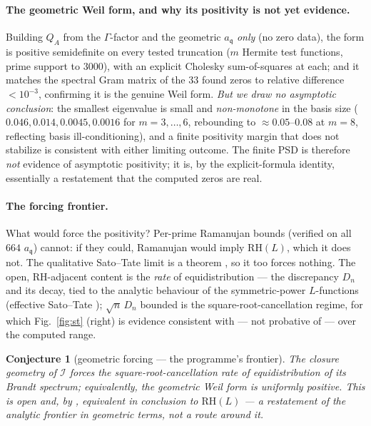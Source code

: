 \documentclass[11pt]{article}
\newtheorem{conjecture}[theorem]{Conjecture}
\theoremstyle{remark}
\newcommand{\II}{\mathcal{I}}
\newcommand{\RH}{\mathrm{RH}}
\newcommand{\fq}{\mathfrak{q}}
\begin{document}
\paragraph{The geometric Weil form, and why its positivity is not yet evidence.} Building
$Q_A$ from the $\Gamma$-factor and the geometric $a_\fq$ \emph{only} (no zero data), the form
is positive semidefinite on every tested truncation ($m$ Hermite test functions, prime
support to $3000$), with an explicit Cholesky sum-of-squares at each; and it matches the
spectral Gram matrix of the $33$ found zeros to relative difference $<10^{-3}$, confirming
it is the genuine Weil form. \emph{But we draw no asymptotic conclusion}: the smallest
eigenvalue is small and \emph{non-monotone} in the basis size ($0.046,0.014,0.0045,0.0016$
for $m=3,\dots,6$, rebounding to $\approx0.05$--$0.08$ at $m=8$, reflecting basis
ill-conditioning), and a finite positivity margin that does not stabilize is consistent
with either limiting outcome. The finite PSD is therefore \emph{not} evidence of asymptotic
positivity; it is, by the explicit-formula identity, essentially a restatement that the
computed zeros are real.

\paragraph{The forcing frontier.} What would force the positivity? Per-prime Ramanujan
bounds (verified on all $664$ $a_\fq$) cannot: if they could, Ramanujan would imply
$\RH(L)$, which it does not. The qualitative Sato--Tate limit is a theorem \cite{BLGHT}, so
it too forces nothing. The open, $\RH$-adjacent content is the \emph{rate} of
equidistribution --- the discrepancy $D_n$ and its decay, tied to the analytic behaviour of the symmetric-power
$L$-functions (effective Sato--Tate \cite{MurtySinha}); $\sqrt n\,D_n$ bounded is the
square-root-cancellation regime, for which Fig.~\ref{fig:st} (right) is evidence consistent
with --- not probative of --- over the computed range.

\begin{conjecture}[geometric forcing --- the programme's frontier]\label{conj:force}
The closure geometry of $\II$ forces the square-root-cancellation rate of equidistribution
of its Brandt spectrum; equivalently, the geometric Weil form is uniformly positive. This is
\emph{open} and, by \cite{Flagship}, equivalent in conclusion to $\RH(L)$ --- a restatement
of the analytic frontier in geometric terms, not a route around it.
\end{conjecture}
\end{document}

